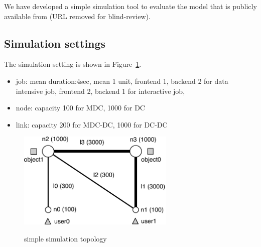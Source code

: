 
We have developed a simple simulation tool to evaluate the model
that is publicly available from (URL removed for blind-review).

\subsection{Simulation settings}

The simulation setting is shown in Figure~\ref{fig:topology-simple}.
\begin{itemize}
  \item		job: mean duration:4sec, mean 1 unit,
        frontend 1, backend 2 for data intensive job,
        frontend 2, backend 1 for interactive job,
  \item		node: capacity 100 for MDC, 1000 for DC
  \item		link: capacity 200 for MDC-DC, 1000 for DC-DC
\end{itemize}

\begin{figure}[tb]
  \begin{center}
    \includegraphics[width=7.5cm,clip]{topology-simple.pdf}
    \vspace{-2.0ex}
    \caption{simple simulation topology}
    \label{fig:topology-simple}
  \end{center}
\end{figure}

